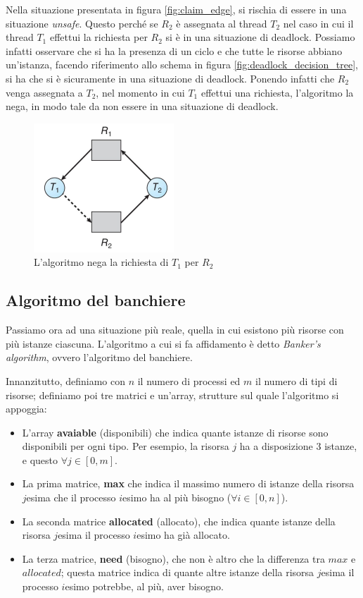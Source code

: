 Nella situazione presentata in figura \ref{fig:claim_edge}, si rischia di essere in una situazione \textit{unsafe}. Questo perché se $R_2$ è assegnata al thread $T_2$ nel caso in cui il thread $T_1$ effettui la richiesta per $R_2$ si è in una situazione di deadlock. Possiamo infatti osservare che si ha la presenza di un ciclo e che tutte le risorse abbiano un'istanza, facendo riferimento allo schema in figura \ref{fig:deadlock_decision_tree}, si ha che si è sicuramente in una situazione di deadlock. Ponendo infatti che $R_2$ venga assegnata a $T_2$, nel momento in cui $T_1$ effettui una richiesta, l'algoritmo la nega, in modo tale da non essere in una situazione di deadlock.
\begin{figure}[h]
    \centering
    \includegraphics[width = .4\textwidth]{../res/imgs/deadlocks/request_denied.png}
    \caption{L'algoritmo nega la richiesta di $T_1$ per $R_2$}
    \label{fig:request_denied}
\end{figure}
% 
\subsection{Algoritmo del banchiere}
Passiamo ora ad una situazione più reale, quella in cui esistono più risorse con più istanze ciascuna. L'algoritmo a cui si fa affidamento è detto \textit{Banker's algorithm}, ovvero l'algoritmo del banchiere.

Innanzitutto, definiamo con $n$ il numero di processi ed $m$ il numero di tipi di risorse; definiamo poi tre matrici e un'array, strutture sul quale l'algoritmo si appoggia:
\vspace{-15pt}
\begin{itemize}
\setlength{\itemsep}{-.15 em}
    \item L'array \textbf{avaiable} (disponibili) che indica quante istanze di risorse sono disponibili per ogni tipo. Per esempio, la risorsa $j$ ha a disposizione 3 istanze, e questo $\forall j\in[0,m]$.
    \item La prima matrice, \textbf{max} che indica il massimo numero di istanze della risorsa $j$esima che il processo $i$esimo ha al più bisogno ($\forall i\in[0,n]$).
    \item La seconda matrice \textbf{allocated} (allocato), che indica quante istanze della risorsa $j$esima il processo $i$esimo ha già allocato.
    \item La terza matrice, \textbf{need} (bisogno), che non è altro che la differenza tra $max$ e $allocated$; questa matrice indica di quante altre istanze della risorsa $j$esima il processo $i$esimo potrebbe, al più, aver bisogno.
\end{itemize}

